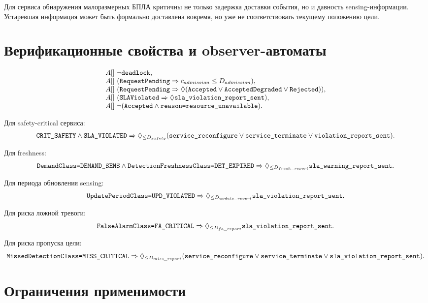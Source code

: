 \documentclass[10pt,a4paper]{article}
\newcommand{\code}[1]{\ifmmode\text{\ttfamily\detokenize{#1}}\else\texttt{\detokenize{#1}}\fi}
\begin{document}
Для сервиса обнаружения малоразмерных БПЛА критичны не только задержка доставки события, но и давность sensing-информации. Устаревшая информация может быть формально доставлена вовремя, но уже не соответствовать текущему положению цели.

\section{Верификационные свойства и observer-автоматы}

\[
\begin{array}{l}
A[]\ \neg\code{deadlock},\\
A[]\ (\code{RequestPending}\Rightarrow c_{admission}\le D_{admission}),\\
A[]\ (\code{RequestPending}\Rightarrow \Diamond(\code{Accepted}\vee \code{AcceptedDegraded}\vee \code{Rejected})),\\
A[]\ (\code{SLAViolated}\Rightarrow \Diamond \code{sla_violation_report_sent}),\\
A[]\ \neg(\code{Accepted}\land \code{reason=resource_unavailable}).
\end{array}
\]

Для safety-critical сервиса:
\[
\code{CRIT_SAFETY}\land \code{SLA_VIOLATED}\Rightarrow
\Diamond_{\le D_{safety}}
(\code{service_reconfigure}\vee \code{service_terminate}\vee \code{violation_report_sent}).
\]

Для freshness:
\[
\code{DemandClass=DEMAND_SENS}\land \code{DetectionFreshnessClass=DET_EXPIRED}
\Rightarrow
\Diamond_{\le D_{fresh\_report}}\code{sla_warning_report_sent}.
\]

Для периода обновления sensing:
\[
\code{UpdatePeriodClass=UPD_VIOLATED}\Rightarrow
\Diamond_{\le D_{update\_report}}\code{sla_violation_report_sent}.
\]

Для риска ложной тревоги:
\[
\code{FalseAlarmClass=FA_CRITICAL}\Rightarrow
\Diamond_{\le D_{fa\_report}}\code{sla_violation_report_sent}.
\]

Для риска пропуска цели:
\[
\code{MissedDetectionClass=MISS_CRITICAL}\Rightarrow
\Diamond_{\le D_{miss\_report}}
(\code{service_reconfigure}\vee \code{service_terminate}\vee \code{sla_violation_report_sent}).
\]

\section{Ограничения применимости}
\end{document}
